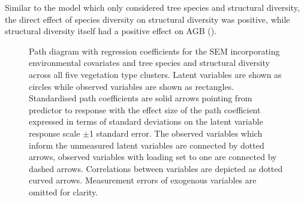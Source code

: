 \documentclass[11pt,a4paper]{article}
\begin{document}
Similar to the model which only considered tree species and structural diversity, the direct effect of species diversity on structural diversity was positive, while structural diversity itself had a positive effect on AGB (\rghb{}). 

\begin{figure}[H]
\centering
	
	\caption{Path diagram with regression coefficients for the SEM incorporating environmental covariates and tree species and structural diversity across all five vegetation type clusters. Latent variables are shown as circles while observed variables are shown as rectangles. Standardised path coefficients are solid arrows pointing from predictor to response with the effect size of the path coefficient expressed in terms of standard deviations on the latent variable response scale $\pm$1 standard error. The observed variables which inform the unmeasured latent variables are connected by dotted arrows, observed variables with loading set to one are connected by dashed arrows. Correlations between variables are depicted as dotted curved arrows. Measurement errors of exogenous variables are omitted for clarity.}
	\label{full_mod}
\end{figure}

\end{document}
